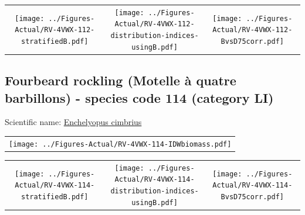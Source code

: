 \documentclass[12pt]{article}\usepackage[]{graphicx}\usepackage[]{color}
\begin{document}
\vspace{1cm}
\begin{minipage}{1.0\textwidth}
 \begin{tabular}{ccc}
\texttt{[image: ../Figures-Actual/RV-4VWX-112-stratifiedB.pdf]} & 
\texttt{[image: ../Figures-Actual/RV-4VWX-112-distribution-indices-usingB.pdf]} & 
\texttt{[image: ../Figures-Actual/RV-4VWX-112-BvsD75corr.pdf]} \\ 
\end{tabular} 
\end{minipage}
\clearpage

\renewcommand\thefigure{\thesubsection\Alph{figure}}

\setcounter{figure}{0}

\hypertarget{sec:114}{%
\subsection{Fourbeard rockling (Motelle à quatre barbillons) - species code 114 (category LI)}\label{sec:114}}

  


Scientific name: \href{http://www.marinespecies.org/aphia.php?p=taxdetails\&id=126450}{Enchelyopus cimbrius} \newline
\begin{minipage}{1.0\textwidth}
 \begin{tabular}{c}
\texttt{[image: ../Figures-Actual/RV-4VWX-114-IDWbiomass.pdf]} \\ 
\end{tabular} 
\end{minipage}
\newline

\vspace{1cm}
\begin{minipage}{1.0\textwidth}
 \begin{tabular}{ccc}
\texttt{[image: ../Figures-Actual/RV-4VWX-114-stratifiedB.pdf]} & 
\texttt{[image: ../Figures-Actual/RV-4VWX-114-distribution-indices-usingB.pdf]} & 
\texttt{[image: ../Figures-Actual/RV-4VWX-114-BvsD75corr.pdf]} \\ 
\end{tabular} 
\end{minipage}
\clearpage
\end{document}
